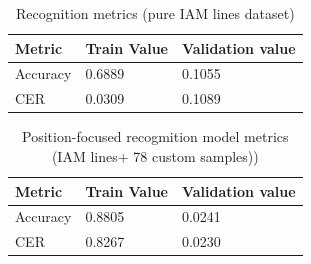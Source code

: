 \begin{table}[htbp]
\begin{center}
\begin{tabular}
{|p{60pt}|p{60pt}|p{100pt}|}
\hline
 Metric  &  Train Value &  Validation value \\
\hline 
Accuracy & 0.6889 & 0.1055 \\ \hline
CER & 0.0309 & 0.1089 \\ \hline

\end{tabular}
\end{center}
\caption{Recognition metrics (pure IAM lines dataset)}
\label{TableRecognitionMetrics}
\end{table}

\begin{table}[htbp]
\begin{center}
\begin{tabular}
{|p{60pt}|p{60pt}|p{100pt}|}
\hline
 Metric  &  Train Value &  Validation value \\
\hline 
Accuracy & 0.8805 & 0.0241 \\ \hline
CER & 0.8267 & 0.0230 \\ \hline

\end{tabular}
\end{center}
\caption{Position-focused recogmition model metrics (IAM lines+ 78 custom samples))}
\label{TablePositionalRecognition}
\end{table}


